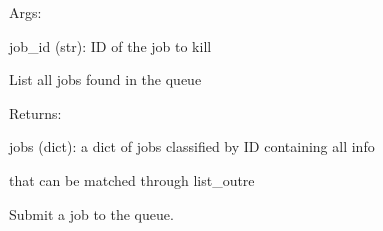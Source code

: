 \documentclass[letterpaper,10pt,english]{sphinxmanual}
\begin{document}
\begin{fulllineitems}
\begin{fulllineitems}
\begin{DUlineblock}{0em}
\item[] Args:
\item[]
\begin{DUlineblock}{\DUlineblockindent}
\item[] job\_id (str): ID of the job to kill
\item[] 
\end{DUlineblock}
\end{DUlineblock}

\end{fulllineitems}


\begin{fulllineitems}
\label{doctree/soprano.hpc.submitter.debug.debugqueue:soprano.hpc.submitter.debug.debugqueue.DebugQueueInterface.list}
List all jobs found in the queue

\begin{DUlineblock}{0em}
\item[] Returns:
\item[]
\begin{DUlineblock}{\DUlineblockindent}
\item[] jobs (dict): a dict of jobs classified by ID containing all info
\item[]
\begin{DUlineblock}{\DUlineblockindent}
\item[] that can be matched through list\_outre
\item[] 
\end{DUlineblock}
\end{DUlineblock}
\end{DUlineblock}

\end{fulllineitems}


\begin{fulllineitems}
\label{doctree/soprano.hpc.submitter.debug.debugqueue:soprano.hpc.submitter.debug.debugqueue.DebugQueueInterface.submit}
Submit a job to the queue.


\end{fulllineitems}
\end{fulllineitems}
\end{document}

